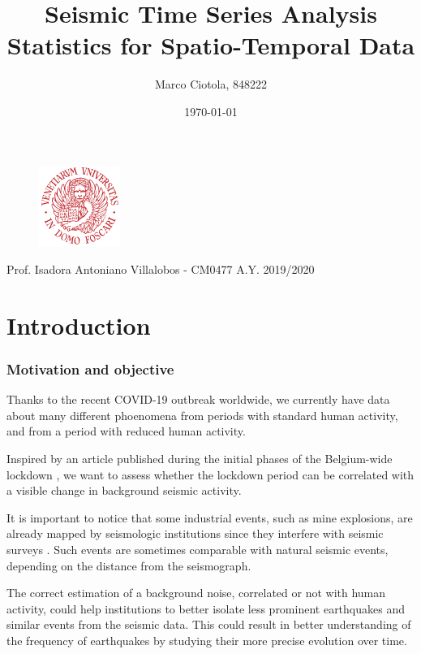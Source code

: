 \documentclass[12pt]{article}
\title{Seismic Time Series Analysis\\Statistics for Spatio-Temporal Data}
\author{Marco Ciotola, 848222}
\date{\today}
\begin{document}
\maketitle
\begin{figure}[t!]
	\begin{center}
		\includegraphics[width=100px]{ca_foscari_logo.png}
	\end{center}
\end{figure}
\vfill Prof. Isadora Antoniano Villalobos - CM0477
\hfill A.Y. 2019/2020
\newpage
\tableofcontents \clearpage
{}



\section{Introduction}

\subsubsection{Motivation and objective}
Thanks to the recent COVID-19 outbreak worldwide, we currently have data about many different phoenomena from periods with standard human activity, and from a period with reduced human activity.

Inspired by an article published during the initial phases of the Belgium-wide lockdown \cite{NatureCoronavirusSeismic}, we want to assess whether the lockdown period can be correlated with a visible change in background seismic activity.

It is important to notice that some industrial events, such as mine explosions, are already mapped by seismologic institutions since they interfere with seismic surveys \cite{OtherSeismicEvents}. Such events are sometimes comparable with natural seismic events, depending on the distance from the seismograph.

The correct estimation of a background noise, correlated or not with human activity, could help institutions to better isolate less prominent earthquakes and similar events from the seismic data. This could result in better understanding of the frequency of earthquakes by studying their more precise evolution over time.
\end{document}
